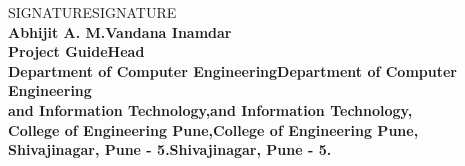 \begin{center}		%

SIGNATURESIGNATURE\\
\normalsize{\bf{Abhijit A. M.Vandana Inamdar\\
Project GuideHead}\\
Department of Computer EngineeringDepartment of Computer Engineering\\
and Information Technology,and Information Technology,\\
College of Engineering Pune,College of Engineering Pune,\\
Shivajinagar, Pune - 5.Shivajinagar, Pune - 5.}
\end{center}


